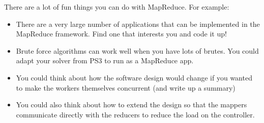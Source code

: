 \documentclass{pset}
\begin{document}
There are a lot of fun things you can do with MapReduce.  For example: \begin{itemize}
\item There are a very large number of applications that can be implemented in
      the MapReduce framework.  Find one that interests you and code it up!

\item Brute force algorithms can work well when you have lots of brutes.  You
      could adapt your solver from PS3 to run as a MapReduce app.

\item You could think about how the software design would change if you wanted
      to make the workers themselves concurrent (and write up a summary)

\item You could also think about how to extend the design so that the mappers
      communicate directly with the reducers to reduce the load on the
      controller.
\end{itemize}
\end{document}
